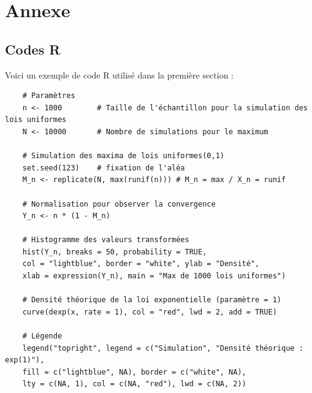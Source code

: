 \documentclass{article}
\begin{document}
\section{Annexe}

\subsection{Codes R}

\noindent Voici un exemple de code R utilisé dans la première section :

\begin{lstlisting}
	# Paramètres
	n <- 1000        # Taille de l'échantillon pour la simulation des lois uniformes
	N <- 10000       # Nombre de simulations pour le maximum
	
	# Simulation des maxima de lois uniformes(0,1)
	set.seed(123)    # fixation de l'aléa
	M_n <- replicate(N, max(runif(n))) # M_n = max / X_n = runif
	
	# Normalisation pour observer la convergence
	Y_n <- n * (1 - M_n)
	
	# Histogramme des valeurs transformées
	hist(Y_n, breaks = 50, probability = TRUE, 
	col = "lightblue", border = "white", ylab = "Densité",
	xlab = expression(Y_n), main = "Max de 1000 lois uniformes")
	
	# Densité théorique de la loi exponentielle (paramètre = 1)
	curve(dexp(x, rate = 1), col = "red", lwd = 2, add = TRUE)
	
	# Légende
	legend("topright", legend = c("Simulation", "Densité théorique : exp(1)"),
	fill = c("lightblue", NA), border = c("white", NA), 
	lty = c(NA, 1), col = c(NA, "red"), lwd = c(NA, 2))
\end{lstlisting}
\end{document}
